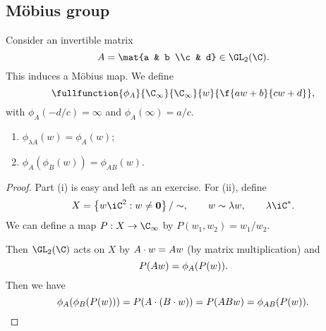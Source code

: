 

\subsection{Möbius group} %
\label{sub:m_bius_group}

Consider an invertible matrix
\begin{equation*}
	A=\mat{a & b \\c & d} \in \GL_2(\C).
\end{equation*}
This induces a Möbius map. We define
\begin{equation*}
	\fullfunction{\phi_A}{\C_\infty}{\C_\infty}{w}{\f{aw+b}{cw+d}},
\end{equation*}
with $\phi_A(-d/c)=\infty$ and $\phi_A(\infty) = a/c$.


\begin{lemma}
\mbox{}
\begin{enumerate}
	\shortskip
	\item $\phi_{\lambda A}(w)=\phi_A(w)$;
	\item $\phi_A(\phi_B(w)) = \phi_{AB}(w)$.
\end{enumerate}
\end{lemma}

\begin{proof}
	Part (i) is easy and left as an exercise. For (ii), define
	\begin{equation*}
		X = \left\{\ww\iC^2 : \ww\neq\bf{0}\right\}/\sim, \qquad \ww\sim\lambda\ww, \qquad \lambda\iC^*.
	\end{equation*}
	We can define a map $P:X\to\C_\infty$ by $P(w_1,w_2) = w_1/w_2$.

	Then $\GL_2(\C)$ acts on $X$ by $A\cdot w = Aw$ (by matrix multiplication) and
	\begin{equation*}
		P(Aw) = \phi_A(P(w)).
	\end{equation*}
	Then we have
	\begin{equation*}
		\phi_A(\phi_B(P(w)))
		= P(A \cdot (B \cdot w))
		= P(ABw)
		= \phi_{AB}(P(w)). \qedhere
	\end{equation*}
\end{proof}

